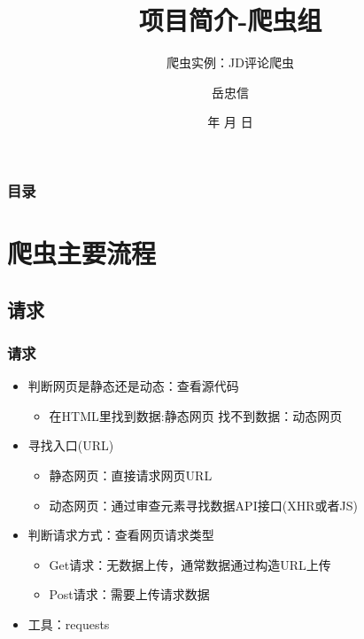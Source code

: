 \documentclass{beamer}
\begin{document}
\title{项目简介-爬虫组}
\subtitle{爬虫实例：JD评论爬虫}

\author{岳忠信}


\renewcommand{\today}{\number\year 年 \number\month 月 \number\day 日}
\date{\today}

\subject{Presentations}

\begin{frame}
\titlepage
\end{frame}

\begin{frame}
\frametitle{目录}
\tableofcontents
\end{frame}


\section{爬虫主要流程}
\subsection{请求}
\begin{frame}
\frametitle{请求}
\begin{itemize}
  \item 判断网页是静态还是动态：查看源代码
  \begin{itemize}
  \item 在HTML里找到数据:静态网页
  \itme 找不到数据：动态网页
  \end{itemize}
  \item 寻找入口(URL)
  \begin{itemize}
    \item 静态网页：直接请求网页URL
    \item 动态网页：通过审查元素寻找数据API接口(XHR或者JS)
  \end{itemize}
  \item 判断请求方式：查看网页请求类型
  \begin{itemize}
    \item Get请求：无数据上传，通常数据通过构造URL上传
    \item Post请求：需要上传请求数据
  \end{itemize}
  \item 工具：requests\footnotemark
\end{itemize}
\end{frame}
\end{document}
